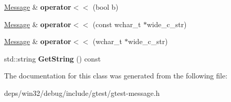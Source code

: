 \begin{DoxyCompactItemize}
\item 
\hypertarget{classtesting_1_1_message_a3e1e04f23b1bdfe18adfd59928296346}{}\hyperlink{classtesting_1_1_message}{Message} \& {\bfseries operator$<$$<$} (bool b)\label{classtesting_1_1_message_a3e1e04f23b1bdfe18adfd59928296346}

\item 
\hypertarget{classtesting_1_1_message_a34774e225944cb6df02db9689d312aae}{}\hyperlink{classtesting_1_1_message}{Message} \& {\bfseries operator$<$$<$} (const wchar\+\_\+t $\ast$wide\+\_\+c\+\_\+str)\label{classtesting_1_1_message_a34774e225944cb6df02db9689d312aae}

\item 
\hypertarget{classtesting_1_1_message_aae57eefb3a72a19c11453d630b1d846c}{}\hyperlink{classtesting_1_1_message}{Message} \& {\bfseries operator$<$$<$} (wchar\+\_\+t $\ast$wide\+\_\+c\+\_\+str)\label{classtesting_1_1_message_aae57eefb3a72a19c11453d630b1d846c}

\item 
\hypertarget{classtesting_1_1_message_abe8c1b7584aa670dd0e2413e8317a937}{}std\+::string {\bfseries Get\+String} () const \label{classtesting_1_1_message_abe8c1b7584aa670dd0e2413e8317a937}

\end{DoxyCompactItemize}


The documentation for this class was generated from the following file\+:\begin{DoxyCompactItemize}
\item 
deps/win32/debug/include/gtest/gtest-\/message.\+h\end{DoxyCompactItemize}
